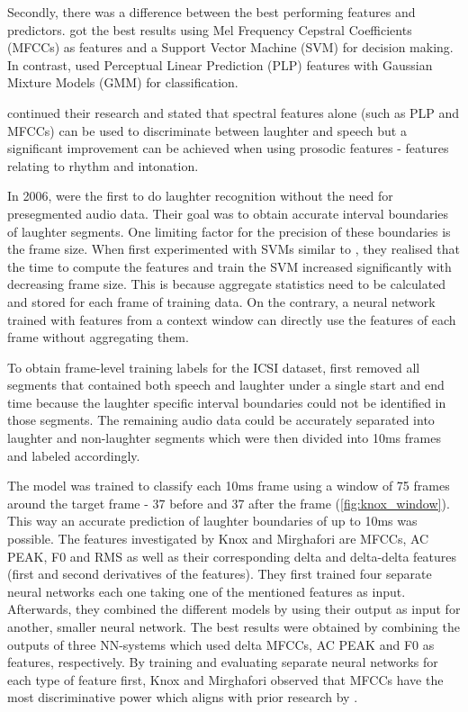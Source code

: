 \documentclass[bsc,frontabs,parskip,deptreport]{infthesis}
\begin{document}
Secondly, there was a difference between the best performing features and predictors.  
\citet{kennedy2004laughter} got the best results using Mel Frequency Cepstral Coefficients (MFCCs) as features and a Support Vector Machine (SVM) for decision making. 
In contrast, \citet{truong2005automatic} used Perceptual Linear Prediction (PLP) features with Gaussian Mixture Models (GMM) for classification. 

\citet{truong2007automatic} continued their research and stated that spectral features alone (such as PLP and MFCCs) can be used to discriminate between laughter and speech but a significant improvement can be achieved when using prosodic features - features relating to rhythm and intonation.

In 2006, \citet{knox2006automatic} were the first to do laughter recognition without the need for presegmented audio data.  
Their goal was to obtain accurate interval boundaries of laughter segments.
One limiting factor for the precision of these boundaries is the frame size. 
When \citet{knox2006automatic} first experimented with SVMs similar to \citet{kennedy2004laughter}, they realised that the time to compute the features and train the SVM increased significantly with decreasing frame size. 
This is because aggregate statistics need to be calculated and stored for each frame of training data.  
On the contrary, a neural network trained with features from a context window can directly use the features of each frame without aggregating them.  

To obtain frame-level training labels for the ICSI dataset, \citet{knox2006automatic} first removed all segments that contained both speech and laughter under a single start and end time because the laughter specific interval boundaries could not be identified in those segments. 
The remaining audio data could be accurately separated into laughter and non-laughter segments which were then divided into 10ms frames and labeled accordingly.

The model was trained to classify each 10ms frame using a window of 75 frames around the target frame - 37 before and 37 after the frame (\autoref{fig:knox_window}).
This way an accurate prediction of laughter boundaries of up to 10ms was possible. 
The features investigated by Knox and Mirghafori are MFCCs, AC PEAK, F0 and RMS as well as their corresponding delta and delta-delta features (first and second derivatives of the features).
They first trained four separate neural networks each one taking one of the mentioned features as input.
Afterwards, they combined the different models by using their output as input for another, smaller neural network.
The best results were obtained by combining the outputs of three NN-systems which used delta MFCCs, AC PEAK and F0 as features, respectively.
By training and evaluating separate neural networks for each type of feature first, Knox and Mirghafori observed that MFCCs have the most discriminative power which aligns with prior research by \citet{kennedy2004laughter}.
\end{document}

